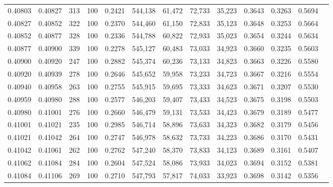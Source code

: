 \begin{tabular}{rrrrrrrrrrrrr}
0.40803 & 0.40827 &   313 & 100 &                                     0.2421 & 544,138 &  61,472 &  72,733 &  35,223 & 0.3643 & 0.3263 & 0.5694 \\
0.40827 & 0.40852 &   322 & 100 &                                     0.2370 & 544,460 &  61,150 &  72,833 &  35,123 & 0.3648 & 0.3253 & 0.5664 \\
0.40852 & 0.40877 &   328 & 100 &                                     0.2336 & 544,788 &  60,822 &  72,933 &  35,023 & 0.3654 & 0.3244 & 0.5634 \\
0.40877 & 0.40900 &   339 & 100 &                                     0.2278 & 545,127 &  60,483 &  73,033 &  34,923 & 0.3660 & 0.3235 & 0.5603 \\
0.40900 & 0.40920 &   247 & 100 &                                     0.2882 & 545,374 &  60,236 &  73,133 &  34,823 & 0.3663 & 0.3226 & 0.5580 \\
0.40920 & 0.40939 &   278 & 100 &                                     0.2646 & 545,652 &  59,958 &  73,233 &  34,723 & 0.3667 & 0.3216 & 0.5554 \\
0.40940 & 0.40958 &   263 & 100 &                                     0.2755 & 545,915 &  59,695 &  73,333 &  34,623 & 0.3671 & 0.3207 & 0.5530 \\
0.40959 & 0.40980 &   288 & 100 &                                     0.2577 & 546,203 &  59,407 &  73,433 &  34,523 & 0.3675 & 0.3198 & 0.5503 \\
0.40980 & 0.41001 &   276 & 100 &                                     0.2660 & 546,479 &  59,131 &  73,533 &  34,423 & 0.3679 & 0.3189 & 0.5477 \\
0.41001 & 0.41021 &   235 & 100 &                                     0.2985 & 546,714 &  58,896 &  73,633 &  34,323 & 0.3682 & 0.3179 & 0.5456 \\
0.41021 & 0.41042 &   264 & 100 &                                     0.2747 & 546,978 &  58,632 &  73,733 &  34,223 & 0.3686 & 0.3170 & 0.5431 \\
0.41042 & 0.41061 &   262 & 100 &                                     0.2762 & 547,240 &  58,370 &  73,833 &  34,123 & 0.3689 & 0.3161 & 0.5407 \\
0.41062 & 0.41084 &   284 & 100 &                                     0.2604 & 547,524 &  58,086 &  73,933 &  34,023 & 0.3694 & 0.3152 & 0.5381 \\
0.41084 & 0.41106 &   269 & 100 &                                     0.2710 & 547,793 &  57,817 &  74,033 &  33,923 & 0.3698 & 0.3142 & 0.5356 \\

\end{tabular}
